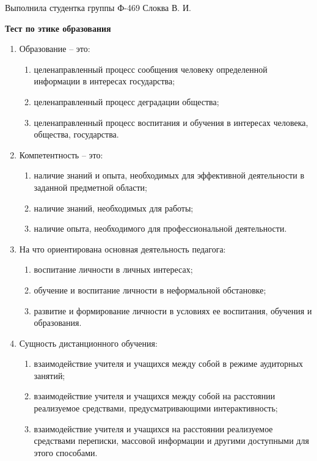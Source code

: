 \documentclass[12pt,pscyr]{hedwork}
\renewcommand{\labelenumii}{\asbuk{enumii})}
\newcommand{\itempo}{\stepcounter{enumii}\item[\bfseries\labelenumii]}
\begin{document}
  
  \begin{flushright}
    Выполнила студентка группы Ф-469 Слоква В. И.
  \end{flushright}
  \vspace{-2em}
  \begin{center}
    \bfseries Тест по этике образования
  \end{center}

  \begin{enumerate}
    \item Образование -- это:
      \begin{enumerate}
        \item целенаправленный процесс сообщения человеку определенной
          информации в интересах государства;
        \item целенаправленный процесс деградации общества;
        \itempo целенаправленный процесс воспитания и обучения в интересах
          человека, общества, государства.
      \end{enumerate}

    \item Компетентность -- это:
      \begin{enumerate}
        \itempo наличие знаний и опыта, необходимых для эффективной деятельности
          в заданной предметной области;
        \item наличие знаний, необходимых для работы;
        \item наличие опыта, необходимого для профессиональной деятельности.
      \end{enumerate}

    \item На что ориентирована основная деятельность педагога:
      \begin{enumerate}
        \item воспитание личности в личных интересах;
        \item обучение и воспитание личности в неформальной обстановке;
        \itempo развитие и формирование личности в условиях ее воспитания,
          обучения и образования.
      \end{enumerate}

    \item Сущность дистанционного обучения:
      \begin{enumerate}
        \item взаимодействие учителя и учащихся между собой в режиме аудиторных
          занятий;
        \itempo взаимодействие учителя и учащихся между собой на расстоянии
          реализуемое средствами, предусматривающими интерактивность;
        \item взаимодействие учителя и учащихся на расстоянии реализуемое
          средствами переписки, массовой информации и другими доступными для
          этого способами.
      \end{enumerate}
 

\end{enumerate}
\end{document}
